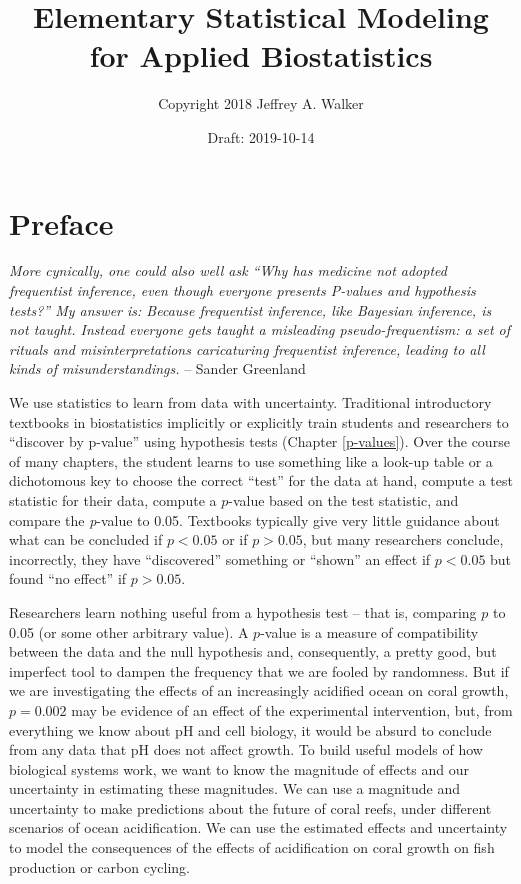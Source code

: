 \documentclass[]{book}
\title{Elementary Statistical Modeling for Applied Biostatistics}
\author{Copyright 2018 Jeffrey A. Walker}
\date{Draft: 2019-10-14}
\begin{document}
\maketitle

{
\setcounter{tocdepth}{1}
\tableofcontents
}
\chapter*{Preface}\label{preface}

\emph{More cynically, one could also well ask ``Why has medicine not
adopted frequentist inference, even though everyone presents P-values
and hypothesis tests?'' My answer is: Because frequentist inference,
like Bayesian inference, is not taught. Instead everyone gets taught a
misleading pseudo-frequentism: a set of rituals and misinterpretations
caricaturing frequentist inference, leading to all kinds of
misunderstandings.} -- Sander Greenland

We use statistics to learn from data with uncertainty. Traditional
introductory textbooks in biostatistics implicitly or explicitly train
students and researchers to ``discover by p-value'' using hypothesis
tests (Chapter \ref{p-values}). Over the course of many chapters, the
student learns to use something like a look-up table or a dichotomous
key to choose the correct ``test'' for the data at hand, compute a test
statistic for their data, compute a \(p\)-value based on the test
statistic, and compare the \emph{p}-value to 0.05. Textbooks typically
give very little guidance about what can be concluded if \(p < 0.05\) or
if \(p > 0.05\), but many researchers conclude, incorrectly, they have
``discovered'' something or ``shown'' an effect if \(p < 0.05\) but
found ``no effect'' if \(p > 0.05\).

Researchers learn nothing useful from a hypothesis test -- that is,
comparing \(p\) to 0.05 (or some other arbitrary value). A \(p\)-value
is a measure of compatibility between the data and the null hypothesis
and, consequently, a pretty good, but imperfect tool to dampen the
frequency that we are fooled by randomness. But if we are investigating
the effects of an increasingly acidified ocean on coral growth,
\(p=0.002\) may be evidence of an effect of the experimental
intervention, but, from everything we know about pH and cell biology, it
would be absurd to conclude from any data that pH does not affect
growth. To build useful models of how biological systems work, we want
to know the magnitude of effects and our uncertainty in estimating these
magnitudes. We can use a magnitude and uncertainty to make predictions
about the future of coral reefs, under different scenarios of ocean
acidification. We can use the estimated effects and uncertainty to model
the consequences of the effects of acidification on coral growth on fish
production or carbon cycling.
\end{document}
